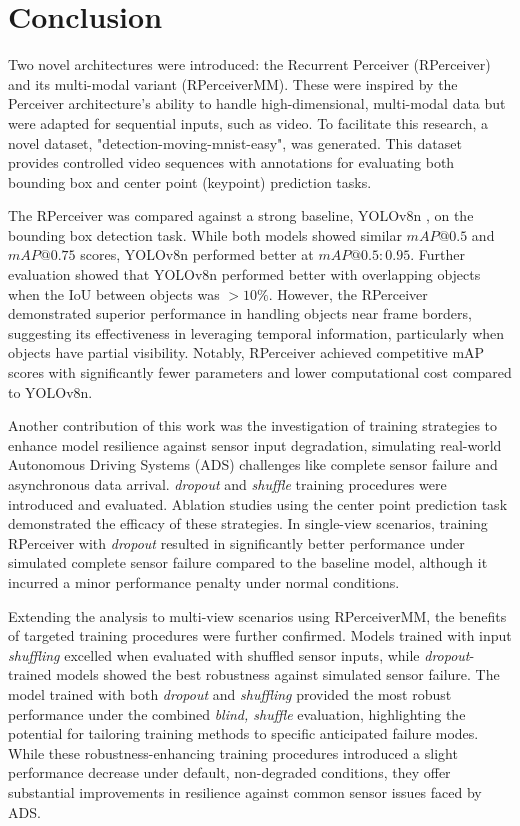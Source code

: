 \section{Conclusion} \label{Conclusion}

Two novel architectures were introduced: the Recurrent Perceiver (RPerceiver) and its multi-modal variant (RPerceiverMM). These were inspired by the Perceiver architecture's \cite{jaeglePerceiverGeneralPerception2021} ability to handle high-dimensional, multi-modal data but were adapted for sequential inputs, such as video. To facilitate this research, a novel dataset, "detection-moving-mnist-easy", was generated. This dataset provides controlled video sequences with annotations for evaluating both bounding box and center point (keypoint) prediction tasks.

The RPerceiver was compared against a strong baseline, YOLOv8n \cite{Jocher_Ultralytics_YOLO_2023}, on the bounding box detection task.
While both models showed similar $mAP@0.5$ and $mAP@0.75$ scores, YOLOv8n performed better at $mAP@0.5:0.95$. Further evaluation showed that YOLOv8n performed better with overlapping objects when the $\mathrm{IoU}$ between objects was $\gt 10\%$. However, the RPerceiver demonstrated superior performance in handling objects near frame borders, suggesting its effectiveness in leveraging temporal information, particularly when objects have partial visibility.
Notably, RPerceiver achieved competitive mAP scores with significantly fewer parameters and lower computational cost compared to YOLOv8n.

Another contribution of this work was the investigation of training strategies to enhance model resilience against sensor input degradation, simulating real-world Autonomous Driving Systems (ADS) challenges like complete sensor failure and asynchronous data arrival.
\textit{dropout} and \textit{shuffle} training procedures were introduced and evaluated.
Ablation studies using the center point prediction task demonstrated the efficacy of these strategies. In single-view scenarios, training RPerceiver with \textit{dropout} resulted in significantly better performance under simulated complete sensor failure compared to the baseline model, although it incurred a minor performance penalty under normal conditions.

Extending the analysis to multi-view scenarios using RPerceiverMM, the benefits of targeted training procedures were further confirmed. Models trained with input \textit{shuffling} excelled when evaluated with shuffled sensor inputs, while \textit{dropout}-trained models showed the best robustness against simulated sensor failure.
The model trained with both \textit{dropout} and \textit{shuffling} provided the most robust performance under the combined \textit{blind, shuffle} evaluation, highlighting the potential for tailoring training methods to specific anticipated failure modes.
While these robustness-enhancing training procedures introduced a slight performance decrease under default, non-degraded conditions, they offer substantial improvements in resilience against common sensor issues faced by ADS.
